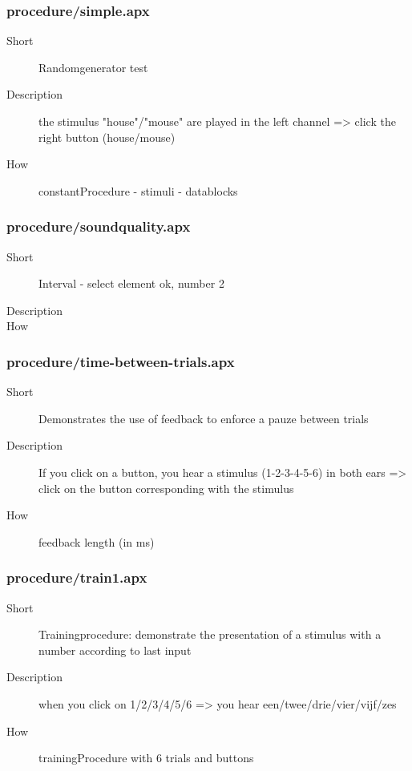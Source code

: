 \subsubsection{procedure/simple.apx}
\begin{description}
\item[Short] 
 Randomgenerator test
\item[Description] 
 the stimulus "house"/"mouse" are played in the left channel =\textgreater{} click the right button (house/mouse)
\item[How] 
 constantProcedure - stimuli - datablocks
\end{description}

\subsubsection{procedure/soundquality.apx}
\begin{description}
\item[Short] 
 Interval - select element ok, number 2
\item[Description] 

\item[How] 

\end{description}

\subsubsection{procedure/time-between-trials.apx}
\begin{description}
\item[Short] 
 Demonstrates the use of feedback to enforce a pauze between trials
\item[Description] 
 If you click on a button, you hear a stimulus (1-2-3-4-5-6) in both ears =\textgreater{} click on the button corresponding with the stimulus
\item[How] 
 feedback length (in ms)
\end{description}

\subsubsection{procedure/train1.apx}
\begin{description}
\item[Short] 
 Trainingprocedure: demonstrate the presentation of a stimulus with a number according to last input
\item[Description] 
 when you click on 1/2/3/4/5/6 =\textgreater{} you hear een/twee/drie/vier/vijf/zes
\item[How] 
 trainingProcedure with 6 trials and buttons
\end{description}

